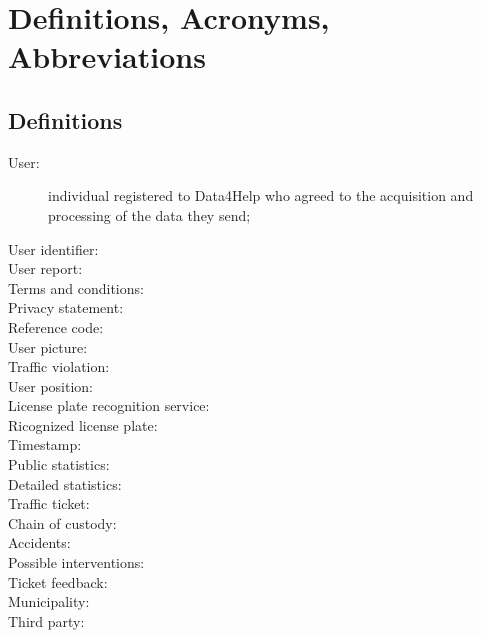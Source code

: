 \documentclass[../../rasd.tex]{subfiles}
\begin{document}
\section{Definitions, Acronyms, Abbreviations\label{sect:1.3}}

\subsection{Definitions\label{sect:1.3.1}}
\begin{description}
	\item[User:] individual registered to Data4Help who agreed to the acquisition and processing of the data they send;
	\item[User identifier:]
	\item[User report:]
	\item[Terms and conditions:]
	\item[Privacy statement:]
	\item[Reference code:]
	\item[User picture:]
	\item[Traffic violation:]
	\item[User position:]
	\item[License plate recognition service:]
	\item[Ricognized license plate:]
	\item[Timestamp:]
	\item[Public statistics:]
	\item[Detailed statistics:]
	\item[Traffic ticket:]
	\item[Chain of custody:]
	\item[Accidents:]
	\item[Possible interventions:]
	\item[Ticket feedback:]
	\item[Municipality:]
	\item[Third party:]
\end{description}
\end{document}

